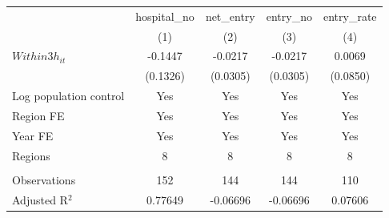 \begingroup
\centering
\begin{tabular}{lcccc}
   \toprule
                          & hospital\_no  & net\_entry  & entry\_no  & entry\_rate \\    
                          & (1)           & (2)         & (3)        & (4)\\  
   \midrule 
   $Within3h_{it}$        & -0.1447       & -0.0217     & -0.0217    & 0.0069\\   
                          & (0.1326)      & (0.0305)    & (0.0305)   & (0.0850)\\   
   Log population control & Yes           & Yes         & Yes        & Yes\\  
   Region FE              & Yes           & Yes         & Yes        & Yes\\  
   Year FE                & Yes           & Yes         & Yes        & Yes\\  
   Regions                & 8             & 8           & 8          & 8\\  
    \\
   Observations           & 152           & 144         & 144        & 110\\  
   Adjusted R$^2$         & 0.77649       & -0.06696    & -0.06696   & 0.07606\\  
   \bottomrule
\end{tabular}
\par\endgroup
